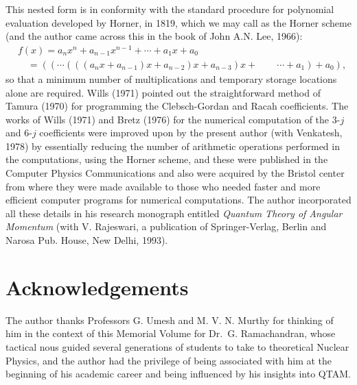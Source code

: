 This nested form is in conformity with the standard procedure for polynomial evaluation developed by Horner, in 1819, which we may call as the Horner scheme (and the author came across this in the book of John A.N. Lee, 1966):
\begin{equation}
\begin{split}
& f(x) = a_nx^n + a_{n-1}x^{n-1} + \cdots + a_1x + a_0 \\
& \quad = ((\cdots (((a_nx+ a_{n-1})x + a_{n-2})x + a_{n-3})x + \qquad \cdots + a_1) + a_0), \label{chap7-eq61}
\end{split}
\end{equation}
so that a minimum number of multiplications and temporary storage locations alone are required. Wills (1971) pointed out the straightforward method of Tamura (1970) for programming the Clebsch-Gordan and Racah coefficients. The works of Wills (1971) and Bretz (1976) for the numerical computation of the 3-$j$ and 6-$j$ coefficients were improved upon by the present author (with Venkatesh, 1978) by essentially reducing the number of arithmetic operations performed in the computations, using the Horner scheme, and these were published in the Computer Physics Communications and also were acquired by the Bristol center from where they were made available to those who needed faster and more efficient computer programs for numerical computations. The author incorporated all these details in his research monograph entitled \textit{Quantum Theory of Angular Momentum} (with V. Rajeswari, a publication of Springer-Verlag, Berlin and Narosa Pub. House, New Delhi, 1993).

\section*{Acknowledgements}

The author thanks Professors G. Umesh and M. V. N. Murthy 
for thinking of him in the context of this Memorial Volume for Dr.\ G. Ramachandran, whose tactical nous guided several generations of students to take to theoretical Nuclear Physics, and the author had the privilege of being associated with him at the beginning of his academic career and being influenced by his insights into QTAM.

